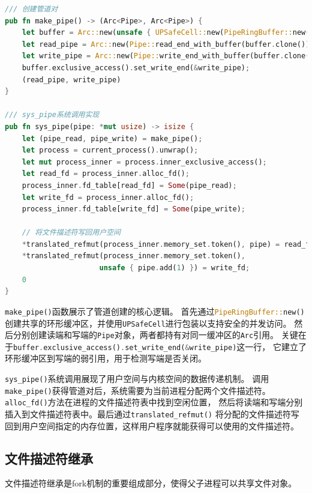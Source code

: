 \begin{lstlisting}[language=Rust,caption={管道创建}, label={lst:pipe-creation}]
/// 创建管道对
pub fn make_pipe() -> (Arc<Pipe>, Arc<Pipe>) {
    let buffer = Arc::new(unsafe { UPSafeCell::new(PipeRingBuffer::new()) });
    let read_pipe = Arc::new(Pipe::read_end_with_buffer(buffer.clone()));
    let write_pipe = Arc::new(Pipe::write_end_with_buffer(buffer.clone()));
    buffer.exclusive_access().set_write_end(&write_pipe);
    (read_pipe, write_pipe)
}

/// sys_pipe系统调用实现
pub fn sys_pipe(pipe: *mut usize) -> isize {
    let (pipe_read, pipe_write) = make_pipe();
    let process = current_process().unwrap();
    let mut process_inner = process.inner_exclusive_access();
    let read_fd = process_inner.alloc_fd();
    process_inner.fd_table[read_fd] = Some(pipe_read);
    let write_fd = process_inner.alloc_fd();
    process_inner.fd_table[write_fd] = Some(pipe_write);
    
    // 将文件描述符写回用户空间
    *translated_refmut(process_inner.memory_set.token(), pipe) = read_fd;
    *translated_refmut(process_inner.memory_set.token(), 
                      unsafe { pipe.add(1) }) = write_fd;
    0
}
\end{lstlisting}

\lstinline[language=Rust]{make_pipe()}函数展示了管道创建的核心逻辑。
首先通过\lstinline[language=Rust]{PipeRingBuffer::new()}创建共享的环形缓冲区，并使用\lstinline[language=Rust]{UPSafeCell}进行包装以支持安全的并发访问。
然后分别创建读端和写端的\lstinline[language=Rust]{Pipe}对象，两者都持有对同一缓冲区的\lstinline[language=Rust]{Arc}引用。
关键在于\lstinline[language=Rust]{buffer.exclusive_access().set_write_end(&write_pipe)}这一行，
它建立了环形缓冲区到写端的弱引用，用于检测写端是否关闭。

\lstinline[language=Rust]{sys_pipe()}系统调用展现了用户空间与内核空间的数据传递机制。
调用\lstinline[language=Rust]{make_pipe()}获得管道对后，系统需要为当前进程分配两个文件描述符。
\lstinline[language=Rust]{alloc_fd()}方法在进程的文件描述符表中找到空闲位置，
然后将读端和写端分别插入到文件描述符表中。最后通过\lstinline[language=Rust]{translated_refmut()}
将分配的文件描述符写回到用户空间指定的内存位置，这样用户程序就能获得可以使用的文件描述符。

\subsection{文件描述符继承}

文件描述符继承是fork机制的重要组成部分，使得父子进程可以共享文件对象。

